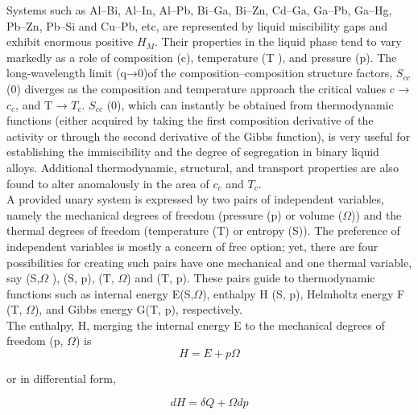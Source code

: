 \documentclass[12pt]{article}
\newcommand*{\1}{\hspace{1pt}}
\begin{document}
    
        Systems such as Al–Bi, Al–In, Al–Pb, Bi–Ga, Bi–Zn, Cd–Ga, Ga–Pb, Ga–Hg, Pb–Zn, Pb–Si 
    and Cu–Pb, etc, are represented by liquid miscibility gaps and exhibit enormous positive 
    $H_{M}$. Their properties in the liquid phase tend to vary markedly as a role of composition (c),
    temperature (T ), and pressure (p). The long-wavelength limit (q→0)of the 
    composition–composition structure factors, $S_{cc}$ (0) diverges as the composition and 
    temperature approach the critical values c → $c_{c}$, and T → $T_{c}$. $S_{cc}$ (0), which can instantly
    be obtained from thermodynamic functions (either acquired by taking the first composition 
    derivative of the activity or through the second derivative of the Gibbs function), is 
    very useful for establishing the immiscibility and the degree of segregation in binary 
    liquid alloys. Additional thermodynamic, structural, and transport properties are also 
    found to alter anomalously in the area of $c_{c}$ and $T_{c}$. \\ 


        A provided unary system is expressed by two pairs of independent variables, namely 
    the mechanical degrees of freedom (pressure (p) or volume ($\Omega$)) and the thermal 
    degrees of freedom (temperature (T) or entropy (S)). The preference of independent 
    variables is mostly a concern of free option; yet, there are four possibilities for 
    creating such pairs have one mechanical and one thermal variable, say (S,$\Omega$ ), 
    (S, p), (T, $\Omega$) and (T, p). These pairs guide to thermodynamic functions such as 
    internal energy E(S,$\Omega$), enthalpy H (S, p), Helmholtz energy F (T, $\Omega$), and 
    Gibbs energy G(T, p), respectively.\\

    The enthalpy, H, merging the internal energy E to the mechanical degrees of freedom
    (p, $\Omega$) is\\
                    
                 \begin{equation}
                    H = E + p\Omega
                \end{equation}

    or in differential form,
                
                \begin{equation}
                    dH = \delta Q + \Omega dp
                \end{equation}
\end{document}
